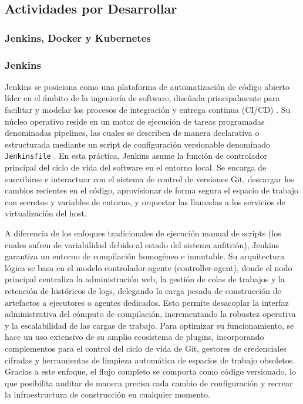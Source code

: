 \documentclass{article}
\begin{document}
\subsection{Actividades por Desarrollar}
\subsubsection{Jenkins, Docker y Kubernetes}

\subsubsection*{Jenkins}
Jenkins se posiciona como una plataforma de automatización de código abierto líder en el ámbito de la ingeniería de software, diseñada principalmente para facilitar y modelar los procesos de integración y entrega continua (CI/CD) \cite{jenkinsdocs}. Su núcleo operativo reside en un motor de ejecución de tareas programadas denominadas pipelines, las cuales se describen de manera declarativa o estructurada mediante un script de configuración versionable denominado \texttt{Jenkinsfile} \cite{jenkinspipeline}. En esta práctica, Jenkins asume la función de controlador principal del ciclo de vida del software en el entorno local. Se encarga de suscribirse e interactuar con el sistema de control de versiones Git, descargar los cambios recientes en el código, aprovisionar de forma segura el espacio de trabajo con secretos y variables de entorno, y orquestar las llamadas a los servicios de virtualización del host.

A diferencia de los enfoques tradicionales de ejecución manual de scripts (los cuales sufren de variabilidad debido al estado del sistema anfitrión), Jenkins garantiza un entorno de compilación homogéneo e inmutable. Su arquitectura lógica se basa en el modelo controlador-agente (controller-agent), donde el nodo principal centraliza la administración web, la gestión de colas de trabajos y la retención de históricos de logs, delegando la carga pesada de construcción de artefactos a ejecutores o agentes dedicados. Esto permite desacoplar la interfaz administrativa del cómputo de compilación, incrementando la robustez operativa y la escalabilidad de las cargas de trabajo. Para optimizar su funcionamiento, se hace un uso extensivo de su amplio ecosistema de plugins, incorporando complementos para el control del ciclo de vida de Git, gestores de credenciales cifradas y herramientas de limpieza automática de espacios de trabajo obsoletos. Gracias a este enfoque, el flujo completo se comporta como código versionado, lo que posibilita auditar de manera precisa cada cambio de configuración y recrear la infraestructura de construcción en cualquier momento.
\end{document}
